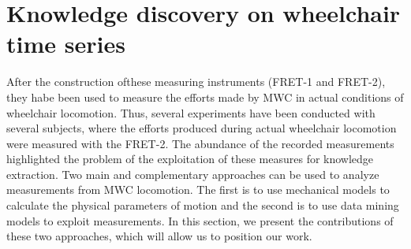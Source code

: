 \section[Wheelchair time series]{Knowledge discovery on wheelchair time series}
After the construction ofthese measuring instruments (FRET-1 and FRET-2), they habe been used to measure the efforts made by MWC in actual conditions of wheelchair locomotion. Thus, several experiments have been conducted with several subjects,  where the efforts produced during actual wheelchair locomotion were measured with the FRET-2. The abundance of the recorded measurements highlighted the problem of the exploitation of these measures for knowledge extraction. Two main and complementary approaches can be used to analyze measurements from MWC locomotion. The first is to use mechanical models to calculate the physical parameters of motion and the second is to use data mining models to exploit measurements.  In this section, we present the contributions of these two approaches, which will allow us to position our work.



